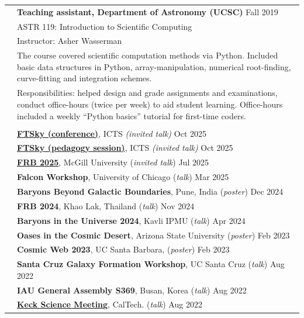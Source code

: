 \documentclass[letterpaper, 11pt]{article}
\begin{document}
\begin{longtable}{p{1.3in}p{4.8in}}
& \textbf{Teaching assistant, Department of Astronomy (UCSC)} \hfill Fall 2019 \\
& ASTR 119: Introduction to Scientific Computing \\
& Instructor: Asher Wasserman\\
& The course covered scientific computation methods via Python. Included basic data structures in Python, array-manipulation, numerical root-finding, curve-fitting and integration schemes.\\
& Responsibilities: helped design and grade assignments and examinations, conduct office-hours (twice per week) to aid student learning. Office-hours included a weekly ``Python basics'' tutorial for first-time coders.\\
\hline
& \\
{\color{OliveGreen}{Conference}} & \href{https://www.youtube.com/watch?v=x6uZFBR_l-s}{\textbf{FTSky (conference)}}, ICTS \textit{(invited talk)} \hfill Oct 2025\\
{\color{OliveGreen}{presentations}} & \href{https://www.youtube.com/watch?v=GKMQ7f54tpg}{\textbf{FTSky (pedagogy session)}}, ICTS \textit{(invited talk)} \hfill Oct 2025\\
& \href{https://www.youtube.com/live/EitJleKFXxE?feature=shared&t=6828}{\textbf{FRB 2025}}, McGill University (\textit{invited talk}) \hfill Jul 2025 \\
& \textbf{Falcon Workshop}, University of Chicago (\textit{talk}) \hfill Mar 2025 \\
& \textbf{Baryons Beyond Galactic Boundaries}, Pune, India (\textit{poster}) \hfill Dec 2024 \\
& \textbf{FRB 2024}, Khao Lak, Thailand (\textit{talk}) \hfill Nov 2024 \\
& \textbf{Baryons in the Universe 2024}, Kavli IPMU (\textit{talk}) \hfill Apr 2024 \\
& \textbf{Oases in the Cosmic Desert}, Arizona State University (\textit{poster}) \hfill Feb 2023 \\
& \textbf{Cosmic Web 2023}, UC Santa Barbara, (\textit{poster}) \hfill Feb 2023 \\
& \textbf{Santa Cruz Galaxy Formation Workshop}, UC Santa Cruz (\textit{talk}) \hfill Aug 2022 \\
& \textbf{IAU General Assembly S369}, Busan, Korea (\textit{talk}) \hfill Aug 2022 \\
& \href{https://www.youtube.com/watch?v=qIqtrDZBHes&list=PLOydScKsZ5XEbrYIpDETtDEaCPTJkm1EK&index=19}{\textbf{Keck Science Meeting}}, CalTech. (\textit{talk}) \hfill Aug 2022 \\

\end{longtable}
\end{document}
